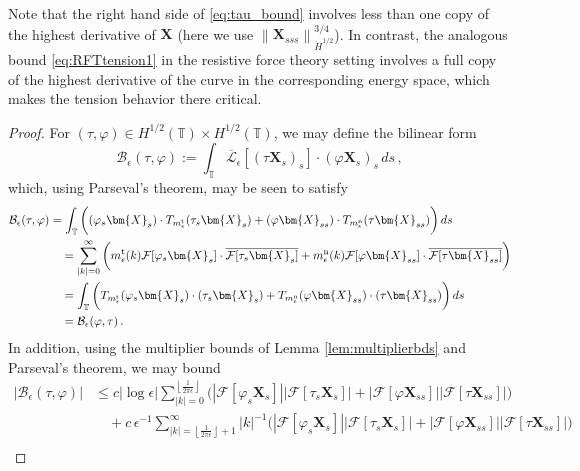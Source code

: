 \documentclass[11pt,reqno]{amsart}
\newcommand{\T}{\mathbb{T}}
\newcommand{\X}{\bm{X}}
\newcommand{\abs}[1]{\left\lvert #1 \right\rvert}
\newcommand{\norm}[1]{\left\lVert #1 \right\rVert}
\newcommand{\floor}[1]{\left\lfloor #1 \right\rfloor}
\newcommand{\mc}[1]{\mathcal{#1}}
\numberwithin{equation}{section}
\theoremstyle{definition}
\begin{document}
Note that the right hand side of \eqref{eq:tau_bound} involves less than one copy of the highest derivative of $\X$ (here we use $\norm{\X_{sss}}_{\dot H^{1/2}}^{3/4}$). In contrast, the analogous bound \eqref{eq:RFTtension1} in the resistive force theory setting involves a full copy of the highest derivative of the curve in the corresponding energy space, which makes the tension behavior there critical. 


\begin{proof}
For $(\tau,\varphi)\in H^{1/2}(\T)\times H^{1/2}(\T)$, we may define the bilinear form
\begin{equation}\label{eq:Beps}
  \mc{B}_\epsilon(\tau,\varphi) := \int_\T \overline{\mc{L}}_\epsilon[(\tau\X_s)_s]\cdot (\varphi\X_s)_s\,ds\,,
\end{equation}
which, using Parseval's theorem, may be seen to satisfy 
\begin{equation}
\begin{aligned}
  \mc{B}_\epsilon(\tau,\varphi) 
  &= \int_\T \bigg( (\varphi_s\X_s)\cdot T_{m_\epsilon^{\rm t}}(\tau_s\X_s)  + (\varphi\X_{ss})\cdot T_{m_\epsilon^{\rm n}}(\tau\X_{ss}) \bigg)\,ds \\
  &\quad= \sum_{\abs{k}=0}^\infty \bigg( m_\epsilon^{\rm t}(k) \mc{F}[\varphi_s\X_s]\cdot \overline{\mc{F}[\tau_s\X_s]}  + m_\epsilon^{\rm n}(k) \mc{F}[\varphi\X_{ss}]\cdot\overline{\mc{F}[\tau\X_{ss}]} \bigg) \\
  &\quad= \int_\T \bigg( T_{m_\epsilon^{\rm t}}(\varphi_s\X_s)\cdot(\tau_s\X_s) + T_{m_\epsilon^{\rm n}}(\varphi\X_{ss})\cdot(\tau\X_{ss}) \bigg)\,ds \\
  &\quad = \mc{B}_\epsilon(\varphi,\tau)\,. 
\end{aligned}
\end{equation}
%
%
In addition, using the multiplier bounds of Lemma \ref{lem:multiplierbds} and Parseval's theorem, we may bound 
\begin{equation}
\begin{aligned}
  \abs{\mc{B}_\epsilon(\tau,\varphi) } &\le 
  c\abs{\log\epsilon}\sum_{\abs{k}=0}^{\floor{\frac{1}{2\pi\epsilon}}} \bigg(\abs{\mc{F}[\varphi_s\X_s]}\abs{\mc{F}[\tau_s\X_s]} + \abs{\mc{F}[\varphi\X_{ss}]}\abs{\mc{F}[\tau\X_{ss}]} \bigg) \\
  &\quad + c\,\epsilon^{-1}\sum_{\abs{k}=\floor{\frac{1}{2\pi\epsilon}}+1}^\infty \abs{k}^{-1}\bigg(\abs{\mc{F}[\varphi_s\X_s]}\abs{\mc{F}[\tau_s\X_s]} + \abs{\mc{F}[\varphi\X_{ss}]}\abs{\mc{F}[\tau\X_{ss}]} \bigg)\\

\end{aligned}
\end{equation}
\end{proof}
\end{document}
